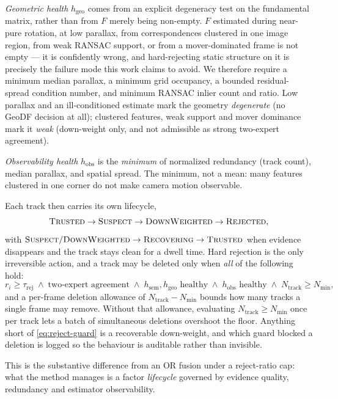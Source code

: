 \documentclass{ieeeaccess}
\begin{document}
\emph{Geometric health} \(h_{\mathrm{geo}}\) comes from an explicit degeneracy test on the fundamental matrix, rather than from \(F\) merely being non-empty. \(F\) estimated during near-pure rotation, at low parallax, from correspondences clustered in one image region, from weak RANSAC support, or from a mover-dominated frame is not empty --- it is confidently wrong, and hard-rejecting static structure on it is precisely the failure mode this work claims to avoid. We therefore require a minimum median parallax, a minimum grid occupancy, a bounded residual-spread condition number, and minimum RANSAC inlier count and ratio. Low parallax and an ill-conditioned estimate mark the geometry \emph{degenerate} (no GeoDF decision at all); clustered features, weak support and mover dominance mark it \emph{weak} (down-weight only, and not admissible as strong two-expert agreement).

\emph{Observability health} \(h_{\mathrm{obs}}\) is the \emph{minimum} of normalized redundancy (track count), median parallax, and spatial spread. The minimum, not a mean: many features clustered in one corner do not make camera motion observable.

Each track then carries its own lifecycle,
\[
\textsc{Trusted}\to\textsc{Suspect}\to\textsc{DownWeighted}\to\textsc{Rejected},
\]
with \(\textsc{Suspect}/\textsc{DownWeighted}\to\textsc{Recovering}\to\textsc{Trusted}\) when evidence disappears and the track stays clean for a dwell time. Hard rejection is the only irreversible action, and a track may be deleted only when \emph{all} of the following hold:
\begin{equation}
\label{eq:reject-guard}
r_i \ge \tau_{\mathrm{rej}}
\;\wedge\;
\text{two-expert agreement}
\;\wedge\;
h_{\mathrm{sem}},h_{\mathrm{geo}} \text{ healthy}
\;\wedge\;
h_{\mathrm{obs}} \text{ healthy}
\;\wedge\;
N_{\mathrm{track}} \ge N_{\min},
\end{equation}
and a per-frame deletion allowance of \(N_{\mathrm{track}}-N_{\min}\) bounds how many tracks a single frame may remove. Without that allowance, evaluating \(N_{\mathrm{track}} \ge N_{\min}\) once per track lets a batch of simultaneous deletions overshoot the floor. Anything short of \eqref{eq:reject-guard} is a recoverable down-weight, and which guard blocked a deletion is logged so the behaviour is auditable rather than invisible.

This is the substantive difference from an OR fusion under a reject-ratio cap: what the method manages is a factor \emph{lifecycle} governed by evidence quality, redundancy and estimator observability.
\end{document}
